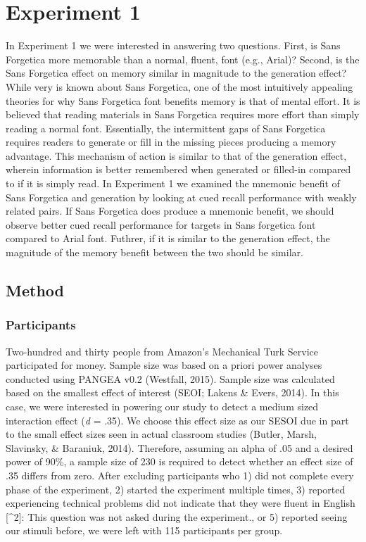 \documentclass[english,doc]{apa6}
\begin{document}
\hypertarget{experiment-1}{%
\section{Experiment 1}\label{experiment-1}}

In Experiment 1 we were interested in answering two questions. First, is Sans Forgetica more memorable than a normal, fluent, font (e.g., Arial)? Second, is the Sans Forgetica effect on memory similar in magnitude to the generation effect? While very is known about Sans Forgetica, one of the most intuitively appealing theories for why Sans Forgetica font benefits memory is that of mental effort. It is believed that reading materials in Sans Forgetica requires more effort than simply reading a normal font. Essentially, the intermittent gaps of Sans Forgetica requires readers to generate or fill in the missing pieces producing a memory advantage. This mechanism of action is similar to that of the generation effect, wherein information is better remembered when generated or filled-in compared to if it is simply read. In Experiment 1 we examined the mnemonic benefit of Sans Forgetica and generation by looking at cued recall performance with weakly related pairs. If Sans Forgetica does produce a mnemonic benefit, we should observe better cued recall performance for targets in Sans forgetica font compared to Arial font. Futhrer, if it is similar to the generation effect, the magnitude of the memory benefit between the two should be similar.

\hypertarget{method}{%
\subsection{Method}\label{method}}

\hypertarget{participants}{%
\subsubsection{Participants}\label{participants}}

Two-hundred and thirty people from Amazon's Mechanical Turk Service participated for money. Sample size was based on a priori power analyses conducted using PANGEA v0.2 (Westfall, 2015). Sample size was calculated based on the smallest effect of interest (SEOI; Lakens \& Evers, 2014). In this case, we were interested in powering our study to detect a medium sized interaction effect (\emph{d} = .35). We choose this effect size as our SESOI due in part to the small effect sizes seen in actual classroom studies (Butler, Marsh, Slavinsky, \& Baraniuk, 2014). Therefore, assuming an alpha of .05 and a desired power of 90\%, a sample size of 230 is required to detect whether an effect size of .35 differs from zero. After excluding participants who 1) did not complete every phase of the experiment, 2) started the experiment multiple times, 3) reported experiencing technical problems did not indicate that they were fluent in English {[}\^{}2{]}: This question was not asked during the experiment., or 5) reported seeing our stimuli before, we were left with 115 participants per group.
\end{document}
